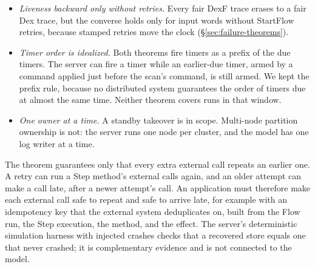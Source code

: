 \begin{itemize}
  every retry set , and a retry reuses
  the first request ID. A retry deduplicates only while the run is still in
  the Flow directory; after the purge it starts a new run. The theorem
  assumes that every retry's command is ordered in the committed log before
  the purge; a retry that reaches the server first can still be ordered
  after it. The Lean model, which keeps a closed run forever, makes this
  hold by construction.
\item \emph{Liveness backward only without retries.} Every fair DexF trace
  erases to a fair Dex trace, but the converse holds only for input words
  without StartFlow retries, because stamped retries move the clock
  (\S\ref{sec:failure-theorems}).
\item \emph{Timer order is idealized.} Both theorems fire timers as a
  prefix of the due timers. The server can fire a timer while an earlier-due
  timer, armed by a command applied just before the scan's command, is
  still armed. We kept the prefix rule, because no distributed
  system guarantees the order of timers due at almost the same time.
  Neither theorem covers runs in that window.
\item \emph{One owner at a time.} A standby takeover is in scope.
  Multi-node partition ownership is not: the server runs one node per
  cluster, and the model has one log writer at a time.
\end{itemize}
The theorem guarantees only that every extra external call
repeats an earlier one. A retry can run a Step method's external calls
again, and an older attempt can make a call late, after a newer attempt's
call. An application must therefore make each external call safe to repeat and safe to arrive late, for
example with an idempotency key that the external system deduplicates on,
built from the Flow run, the Step execution, the method, and the effect.
The server's deterministic simulation harness
with injected crashes checks that a recovered store equals one that never
crashed; it is complementary evidence and is not connected to the model.

